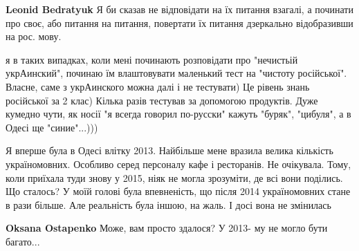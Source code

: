 \begin{itemize}
\begin{itemize}
 
\textbf{Leonid Bedratyuk} Я би сказав не відповідати на їх питання взагалі, а починати про своє, або питання на питання, повертати їх питання дзеркально відобразивши на рос. мову.
\end{itemize}

 

я в таких випадках, коли мені починають розповідати про "нечистьій укрАинский",
починаю їм влаштовувати маленький тест на "чистоту російської". Власне, саме з
укрАинского можна далі і не тестувати) Це рівень знань російської за 2 клас)
Кілька разів тестував за допомогою продуктів. Дуже кумедно чути, як носії "я
всегда говорил по-русски" кажуть "буряк", "цибуля", а в Одесі ще "синие"...)))


 

Я вперше була в Одесі влітку 2013. Найбільше мене вразила велика кількість
україномовних. Особливо серед персоналу кафе і ресторанів. Не очікувала. Тому,
коли приїхала туди знову у 2015, ніяк не могла зрозуміти, де всі вони поділись.
Що сталось? У моїй голові була впевненість, що після 2014 україномовних стане в
рази більше. Але реальність була іншою, на жаль. І досі вона не змінилась

\begin{itemize}
 
\textbf{Oksana Ostapenko} Може, вам просто здалося? У 2013- му не могло бути багато...

 

\end{itemize}
\end{itemize}
